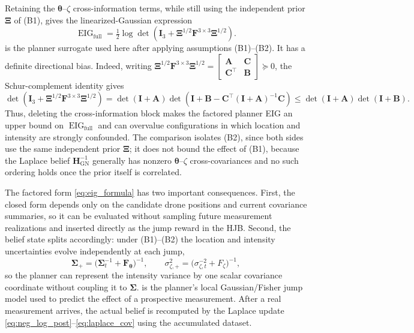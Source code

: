 \documentclass{article}
\newcommand{\bs}[1]{\boldsymbol{#1}}
\begin{document}
Retaining the $\bs\theta$--$\zeta$ cross-information terms, while still using the independent prior $\bs\Xi$ of (B1), gives the linearized-Gaussian expression
\begin{equation}
\operatorname{EIG}_{\mathrm{full}}
=\tfrac12\log\det\!\left(\bs I_3+\bs\Xi^{1/2}\bs F^{3\times3}\bs\Xi^{1/2}\right).
\end{equation}
 is the planner surrogate used here after applying assumptions (B1)--(B2).
It has a definite directional bias.
Indeed, writing $\bs\Xi^{1/2}\bs F^{3\times3}\bs\Xi^{1/2}=\left[\begin{smallmatrix}\bs A&\bs C\\\bs C^\top&\bs B\end{smallmatrix}\right]\succeq0$, the Schur-complement identity gives
\begin{equation}
\det(\bs I_3+\bs\Xi^{1/2}\bs F^{3\times3}\bs\Xi^{1/2})
=\det(\bs I+\bs A)\det\!\left(\bs I+\bs B-\bs C^\top(\bs I+\bs A)^{-1}\bs C\right)
\le \det(\bs I+\bs A)\det(\bs I+\bs B).
\end{equation}
Thus, deleting the cross-information block makes the factored planner EIG an upper bound on $\operatorname{EIG}_{\mathrm{full}}$ and can overvalue configurations in which location and intensity are strongly confounded.
The comparison isolates (B2), since both sides use the same independent prior $\bs\Xi$; it does not bound the effect of (B1), because the Laplace belief $\bs H_{\mathrm{GN}}^{-1}$ generally has nonzero $\bs\theta$--$\zeta$ cross-covariances and no such ordering holds once the prior itself is correlated.

The factored form \eqref{eq:eig_formula} has two important consequences.
First, the closed form depends only on the candidate drone positions and current covariance summaries, so it can be evaluated without sampling future measurement realizations and inserted directly as the jump reward in the HJB.
Second, the belief state splits accordingly: under (B1)--(B2) the location and intensity uncertainties evolve independently at each jump,
\begin{equation}
\label{eq:belief_jump}
\bs\Sigma_+ = \bigl(\bs\Sigma_t^{-1}+\bs F_{\bs\theta}\bigr)^{-1},
\qquad
\sigma_{\zeta,+}^2 = \bigl(\sigma_{\zeta,t}^{-2}+F_\zeta\bigr)^{-1},
\end{equation}
so the planner can represent the intensity variance by one scalar covariance coordinate without coupling it to $\bs\Sigma$.
 is the planner's local Gaussian/Fisher jump model used to predict the effect of a prospective measurement.
After a real measurement arrives, the actual belief is recomputed by the Laplace update \eqref{eq:neg_log_post}--\eqref{eq:laplace_cov} using the accumulated dataset.
\end{document}
